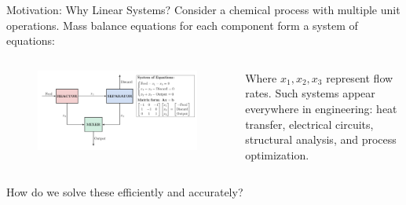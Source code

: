 \documentclass[aspectratio=169]{beamer}
\begin{document}
\begin{frame}{Motivation: Why Linear Systems?}
	\small{
		Consider a chemical process with multiple unit operations. Mass balance equations for each component form a system of equations:
	}
	\vspace{0.3cm}

	\begin{columns}
		\begin{figure}
			\centering
			\includegraphics[width=\textwidth]{figures/process.pdf}
		\end{figure}

		\footnotesize{Where $x_1, x_2, x_3$ represent flow rates. Such systems appear everywhere in engineering: heat transfer, electrical circuits, structural analysis, and process optimization.}
	\end{columns}

	\vspace{0.1cm}
	\alert{How do we solve these efficiently and accurately?}
\end{frame}
\end{document}

